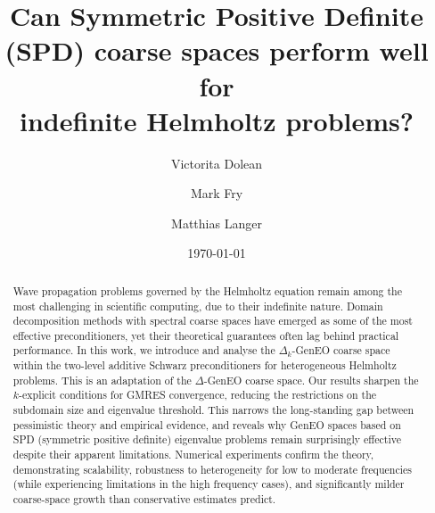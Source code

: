 \documentclass[preprint,3p,times]{elsarticle}
\date{\today}
\theoremstyle{definition}
\numberwithin{equation}{section}
\begin{document}
\begin{frontmatter}




\title{Can Symmetric Positive Definite (SPD) coarse spaces perform well for \\ indefinite Helmholtz problems?}

\author[1]{Victorita Dolean}
\author[2]{Mark Fry}
\author[2]{Matthias Langer} 


\begin{abstract}
Wave propagation problems governed by the Helmholtz equation remain among the most challenging in scientific computing, 
due to their indefinite nature.  Domain decomposition methods with spectral coarse spaces have emerged as some of the
most effective preconditioners, yet their theoretical guarantees often lag behind practical performance. 
In this work, we introduce and analyse the $\Delta_k$-GenEO coarse space within the two-level additive Schwarz preconditioners 
for heterogeneous Helmholtz problems.  This is an adaptation of the $\Delta$-GenEO coarse space. 
Our results sharpen the $k$-explicit conditions for GMRES convergence, reducing the restrictions on the subdomain size and eigenvalue threshold. 
This narrows the long-standing gap between pessimistic theory and empirical evidence, 
and reveals why GenEO spaces based on SPD (symmetric positive definite) eigenvalue problems remain surprisingly effective 
despite their apparent limitations. 
Numerical experiments confirm the theory, demonstrating scalability, robustness to heterogeneity for low to moderate frequencies 
(while experiencing limitations in the high frequency cases), and significantly milder coarse-space growth than conservative estimates predict. 
\end{abstract}


\end{frontmatter}
\end{document}
